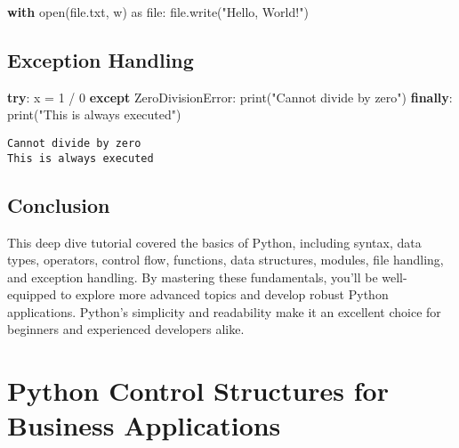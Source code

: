 \documentclass[
  letterpaper,
  DIV=11,
  numbers=noendperiod]{scrreprt}
\newenvironment{Shaded}{\begin{snugshade}}{\end{snugshade}}
\newcommand{\BuiltInTok}[1]{\textcolor[rgb]{0.00,0.23,0.31}{#1}}
\newcommand{\ControlFlowTok}[1]{\textcolor[rgb]{0.00,0.23,0.31}{\textbf{#1}}}
\newcommand{\DecValTok}[1]{\textcolor[rgb]{0.68,0.00,0.00}{#1}}
\newcommand{\ImportTok}[1]{\textcolor[rgb]{0.00,0.46,0.62}{#1}}
\newcommand{\NormalTok}[1]{\textcolor[rgb]{0.00,0.23,0.31}{#1}}
\newcommand{\OperatorTok}[1]{\textcolor[rgb]{0.37,0.37,0.37}{#1}}
\newcommand{\PreprocessorTok}[1]{\textcolor[rgb]{0.68,0.00,0.00}{#1}}
\newcommand{\StringTok}[1]{\textcolor[rgb]{0.13,0.47,0.30}{#1}}
\begin{document}
\begin{Shaded}
\begin{Highlighting}[]
\ControlFlowTok{with} \BuiltInTok{open}\NormalTok{(}\StringTok{\textquotesingle{}file.txt\textquotesingle{}}\NormalTok{, }\StringTok{\textquotesingle{}w\textquotesingle{}}\NormalTok{) }\ImportTok{as} \BuiltInTok{file}\NormalTok{:}
    \BuiltInTok{file}\NormalTok{.write(}\StringTok{"Hello, World!"}\NormalTok{)}
\end{Highlighting}
\end{Shaded}

\section{Exception Handling}\label{exception-handling}

\begin{Shaded}
\begin{Highlighting}[]
\ControlFlowTok{try}\NormalTok{:}
\NormalTok{    x }\OperatorTok{=} \DecValTok{1} \OperatorTok{/} \DecValTok{0}
\ControlFlowTok{except} \PreprocessorTok{ZeroDivisionError}\NormalTok{:}
    \BuiltInTok{print}\NormalTok{(}\StringTok{"Cannot divide by zero"}\NormalTok{)}
\ControlFlowTok{finally}\NormalTok{:}
    \BuiltInTok{print}\NormalTok{(}\StringTok{"This is always executed"}\NormalTok{)}
\end{Highlighting}
\end{Shaded}

\begin{verbatim}
Cannot divide by zero
This is always executed
\end{verbatim}

\section{Conclusion}\label{conclusion-1}

This deep dive tutorial covered the basics of Python, including syntax,
data types, operators, control flow, functions, data structures,
modules, file handling, and exception handling. By mastering these
fundamentals, you'll be well-equipped to explore more advanced topics
and develop robust Python applications. Python's simplicity and
readability make it an excellent choice for beginners and experienced
developers alike.


\chapter{Python Control Structures for Business
Applications}\label{python-control-structures-for-business-applications}
\end{document}
